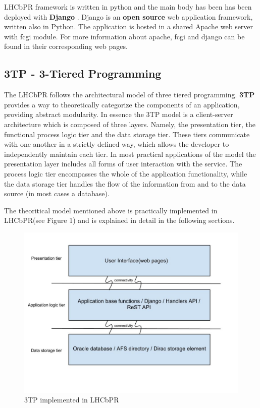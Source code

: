 \documentclass{lhcbnote}
\begin{document}
LHCbPR framework is written in python and the main body has been has been deployed with {\bf Django} . Django is an {\bf open source} web application framework, written also in Python.
 The application is hosted in a shared Apache web server with fcgi module. For more information about apache, fcgi and django can be found in their corresponding web pages.

\subsection{3TP - 3-Tiered Programming}

The LHCbPR follows the architectural model of three tiered programming. {\bf 3TP} provides a way to theoretically categorize the components 
of an application, providing abstract modularity. In essence the 3TP model is a client-server architecture which is composed of three 
layers. Namely,  the presentation tier, the functional process logic tier and the data storage tier. These tiers communicate with one another 
in a strictly defined way, which allows the developer to independently maintain each tier. In most practical applications of the model the presentation layer 
includes all forms of user interaction with the service. The process logic tier encompasses the whole of the application functionality, while the data storage 
tier handles the flow of the information from and to the data source (in most cases a database).

\vspace{4 mm}

The theoritical model mentioned above is practically implemented in LHCbPR(see Figure 1) and is explained in detail in the following sections. 

\begin{figure}[ht!]
\centering
\includegraphics[width=170mm]{my3tp.jpg}
\caption{3TP implemented in LHCbPR}
\label{overflow}
\end{figure}
\end{document}
